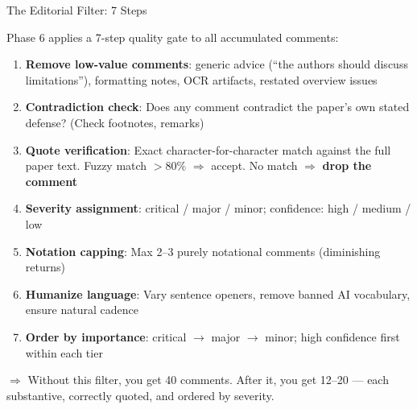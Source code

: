 \documentclass[10pt,english,aspectratio=169]{beamer}
\begin{document}
\begin{frame}{The Editorial Filter: 7 Steps}

Phase 6 applies a 7-step quality gate to all accumulated comments:

\vspace{0.2cm}
\begin{enumerate}
    \item \textbf{Remove low-value comments}: generic advice (``the authors should discuss limitations''), formatting notes, OCR artifacts, restated overview issues

    \vspace{0.1cm}
    \item \textbf{Contradiction check}: Does any comment contradict the paper's own stated defense? (Check footnotes, remarks)

    \vspace{0.1cm}
    \item \textbf{Quote verification}: Exact character-for-character match against the full paper text. Fuzzy match $>80\%$ $\Rightarrow$ accept. No match $\Rightarrow$ \textbf{drop the comment}

    \vspace{0.1cm}
    \item \textbf{Severity assignment}: critical / major / minor; confidence: high / medium / low

    \vspace{0.1cm}
    \item \textbf{Notation capping}: Max 2--3 purely notational comments (diminishing returns)

    \vspace{0.1cm}
    \item \textbf{Humanize language}: Vary sentence openers, remove banned AI vocabulary, ensure natural cadence

    \vspace{0.1cm}
    \item \textbf{Order by importance}: critical $\to$ major $\to$ minor; high confidence first within each tier
\end{enumerate}

\vspace{0.2cm}
$\Rightarrow$ Without this filter, you get 40 comments. After it, you get 12--20 --- each substantive, correctly quoted, and ordered by severity.

\end{frame}
\end{document}
